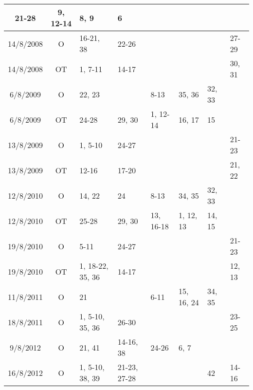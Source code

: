 \begin{longtable}{|c|c|p{1.85cm}|p{1.85cm}|p{1.85cm}|p{1.85cm}|p{1.85cm}|p{1.85cm}|}
	\raggedright 21-28 &
	\raggedright 9, 12-14 &
	\raggedright 8, 9 &
	\raggedright 6 &
	\raggedright 
	\tabularnewline
\hline
    14/8/2008    &
    O    &
    \raggedright 16-21, 38 &
	\raggedright 22-26 &
	\raggedright &
	\raggedright &
	\raggedright &
	\raggedright 27-29
	\tabularnewline
\hline
    14/8/2008    &
    OT    &
    \raggedright 1, 7-11 &
	\raggedright 14-17 &
	\raggedright &
	\raggedright &
	\raggedright &
	\raggedright 30, 31
	\tabularnewline
\hline
    6/8/2009    &
    O    &
    \raggedright 22, 23 &
	\raggedright &
	\raggedright 8-13 &
	\raggedright 35, 36 &
	\raggedright 32, 33 &
	\raggedright 
	\tabularnewline
\hline
    6/8/2009    &
    OT    &
    \raggedright 24-28 &
	\raggedright 29, 30 &
	\raggedright 1, 12-14 &
	\raggedright 16, 17 &
	\raggedright 15 &
	\raggedright 
	\tabularnewline
\hline
    13/8/2009    &
    O    &
    \raggedright 1, 5-10 &
	\raggedright 24-27 &
	\raggedright &
	\raggedright &
	\raggedright &
	\raggedright 21-23
	\tabularnewline
\hline
    13/8/2009    &
    OT    &
    \raggedright 12-16 &
	\raggedright 17-20 &
	\raggedright &
	\raggedright &
	\raggedright &
	\raggedright 21, 22
	\tabularnewline
\hline
    12/8/2010    &
    O    &
    \raggedright 14, 22 &
	\raggedright 24 &
	\raggedright 8-13 &
	\raggedright 34, 35 &
	\raggedright 32, 33 &
	\raggedright 
	\tabularnewline
\hline
    12/8/2010    &
    OT    &
    \raggedright 25-28 &
	\raggedright 29, 30 &
	\raggedright 13, 16-18 &
	\raggedright 1, 12, 13 &
	\raggedright 14, 15 &
	\raggedright 
	\tabularnewline
\hline
    19/8/2010    &
    O    &
    \raggedright 5-11 &
	\raggedright 24-27 &
	\raggedright &
	\raggedright &
	\raggedright &
	\raggedright 21-23
	\tabularnewline
\hline
    19/8/2010    &
    OT    &
    \raggedright 1, 18-22, 35, 36 &
	\raggedright 14-17 &
	\raggedright &
	\raggedright &
	\raggedright &
	\raggedright 12, 13
	\tabularnewline
\hline
    11/8/2011    &
    O    &
    \raggedright 21 &
	\raggedright &
	\raggedright 6-11 &
	\raggedright 15, 16, 24 &
	\raggedright 34, 35 &
	\raggedright 
	\tabularnewline
\hline
    18/8/2011    &
    O    &
    \raggedright 1, 5-10, 35, 36 &
	\raggedright 26-30 &
	\raggedright &
	\raggedright &
	\raggedright &
	\raggedright 23-25
	\tabularnewline
\hline
    9/8/2012    &
    O    &
    \raggedright 21, 41 &
	\raggedright 14-16, 38 &
	\raggedright 24-26 &
	\raggedright 6, 7 &
	\raggedright &
	\raggedright 
	\tabularnewline
\hline
    16/8/2012    &
    O    &
    \raggedright 1, 5-10, 38, 39&
	\raggedright 21-23, 27-28 &
	\raggedright &
	\raggedright &
	\raggedright 42 &
	\raggedright 14-16
	\tabularnewline

\end{longtable}
